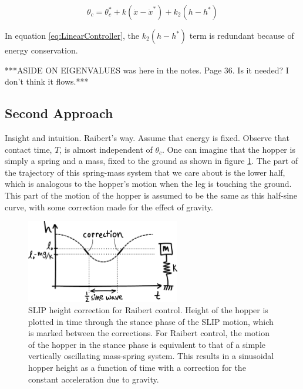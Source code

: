 \begin{equation}
\theta_{c}=\theta_{c}^{*}+k(\dot{x}-\dot{x}^{*})+k_{2}(h-h^{*})
\label{eq:LinearController}
\end{equation}

In equation \ref{eq:LinearController}, the $k_{2}(h-h^{*})$ term is redundant because of energy conservation. 

***ASIDE ON EIGENVALUES was here in the notes. Page 36. Is it needed? I don't think it flows.***

\subsection*{Second Approach}

Insight and intuition. Raibert's way. Assume that energy is fixed. Observe that contact time, $T$, is almost independent of $\theta_{c}$. One can imagine that the hopper is simply a spring and a mass, fixed to the ground as shown in figure \ref{fig:SLIPCorrection}. The part of the trajectory of this spring-mass system that we care about is the lower half, which is analogous to the hopper's motion when the leg is touching the ground. This part of the motion of the hopper is assumed to be the same as this half-sine curve, with some correction made for the effect of gravity. 

\begin{figure}[h]		%
\begin{centering}
\includegraphics[width=0.6\textwidth]{Figures/SLIPCorrection}\par
\end{centering}
\caption[Diagram: SLIP Height Correction for Raibert Control]{SLIP height correction for Raibert control. Height of the hopper is plotted in time through the stance phase of the SLIP motion, which is marked between the corrections. For Raibert control, the motion of the hopper in the stance phase is equivalent to that of a simple vertically oscillating mass-spring system. This results in a sinusoidal hopper height as a function of time with a correction for the constant acceleration due to gravity.}
\label{fig:SLIPCorrection}
\end{figure}
%

